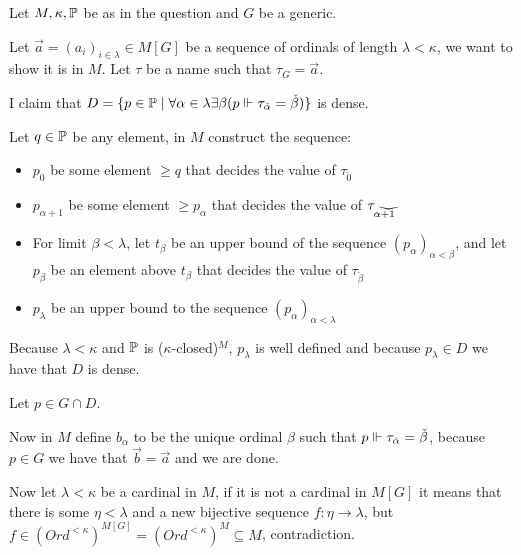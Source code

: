 \begin{cExercise}
	Let $M,\kappa,\P$ be as in the question and $G$ be a generic.
	
	Let $\vec{a}=(a_i)_{i\in\lambda}\in M[G]$ be a sequence of ordinals of length $\lambda<\kappa$, we want to show it is in $M$. Let $\tau$ be a name such that $\tau_G=\vec a$.
	
	I claim that $D=\{p\in \P\mid \forall \alpha\in\lambda\exists \beta (p\force \tau_{\check\alpha}=\check{\beta})\}$ is dense.
	
	Let $q\in \P$ be any element, in $M$ construct the sequence:
	
	\begin{itemize}
		\item $p_0$ be some element $\ge q$ that decides the value of $\tau_{\check 0}$
		\item $p_{\alpha+1}$ be some element $\ge p_\alpha$ that decides the value of $\tau_{\widecheck {\alpha +1}}$
		\item For limit $\beta<\lambda$, let $t_\beta$ be an upper bound of the sequence $(p_{\alpha})_{\alpha<\beta}$, and let $p_\beta$ be an element above $t_\beta$ that decides the value of $\tau_{\check\beta}$
		\item $p_\lambda$ be an upper bound to the sequence $(p_{\alpha})_{\alpha<\lambda}$
	\end{itemize}
	Because $\lambda<\kappa$ and $\P$ is ($\kappa$-closed)$^M$, $p_\lambda$ is well defined and because $p_\lambda\in D$ we have that $D$ is dense.
	
	Let $p \in G\cap D$.
	
	Now in $M$ define $b_\alpha$ to be the unique ordinal $\beta$ such that $p\force \tau_{\check{\alpha}}=\check{\beta}$, because $p\in G$ we have that $\vec b=\vec a$ and we are done.
	
	Now let $\lambda<\kappa$ be a cardinal in $M$, if it is not a cardinal in $M[G]$ it means that there is some $\eta<\lambda$ and a new bijective sequence $f:\eta\to\lambda$, but $f \in (Ord^{<\kappa})^{M[G]}=(Ord^{<\kappa})^M\subseteq M$, contradiction.
\end{cExercise}
